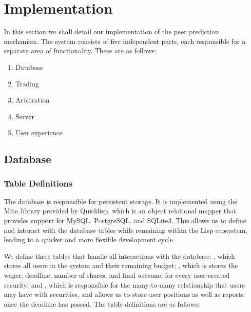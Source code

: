 \section{Implementation}

\label{sec:implementation}

In this section we shall detail our implementation of the peer prediction
mechanism. The system consists of five independent parts, each responsible for
a separate area of functionality. These are as follows:

\begin{enumerate}
	\item Database
	\item Trading
	\item Arbitration
	\item Server
	\item User experience
\end{enumerate}

\subsection{Database}

\label{sec:database}

\subsubsection{Table Definitions}

The database is responsible for persistent storage. It is implemented using the
Mito library provided by Quicklisp, which is an object relational mapper that
provides support for MySQL, PostgreSQL, and SQLite3. This allows us to define
and interact with the database tables while remaining within the Lisp
ecosystem, leading to a quicker and more flexible development cycle.

We define three tables that handle all interactions with the database:
, which stores all users in the system and their remaining budget;
, which is stores the wager, deadline, number of shares, and
final outcome for every user-created security; and , which
is responsible for the many-to-many relationship that users may have with
securities, and allows us to store user positions as well as reports once the
deadline has passed. The table definitions are as follows:

